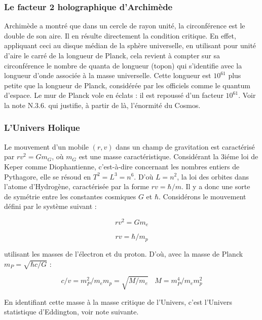 \documentclass[a4paper,12pt]{article}
\begin{document}
\subsubsection{Le facteur 2 holographique d'Archimède}

Archimède a montré que dans un cercle de rayon unité, la circonférence est le double de son aire. Il en résulte directement la condition critique. En effet, appliquant ceci au disque médian de la sphère universelle, en utilisant pour unité d’aire le carré de la longueur de Planck, cela revient à compter sur sa circonférence le nombre de quanta de longueur (topon) qui s’identifie avec la longueur d’onde associée à la masse universelle. Cette longueur est $10^{61}$ plus petite que la longueur de Planck, considérée par les officiels comme le quantum d’espace. Le mur de Planck vole en éclats : il est repoussé d’un facteur $10^{61}$. Voir la note N.3.6. qui justifie, à partir de là, l’énormité du Cosmos. 



\subsubsection{L'Univers Holique}

 Le mouvement d'un mobile $(r,v)$ dans un champ de gravitation est caractérisé par $rv^2 = Gm_G$, où $m_G$ est une masse caractéristique. Considérant la 3iéme loi de Keper comme Diophantienne, c’est-à-dire concernant les nombres entiers de Pythagore, elle se résoud en $T^2 = L^3 = n^6$. D'où $L = n^2$, la loi des orbites dans l'atome d'Hydrogène, caractérisée par la forme $rv = \hbar/m$. Il y a donc une sorte de symétrie entre les constantes cosmiques $G$ et $\hbar$. Considérons le mouvement défini par le système suivant :
 
\begin{equation}
r v^2 = Gm_e
\end{equation}

\begin{equation}
r v = \hbar/m_p
\end{equation}

utilisant les masses de l'électron et du proton. D'où, avec la masse de Planck $m_P = \sqrt{\hbar c/G}$ :

\begin{equation}
c/v = m_P^2/m_em_p = \sqrt{M/m_e}                 ~~~~           M = m_P^4/m_em_p^2
\end{equation}

En identifiant cette masse à la masse critique de l'Univers, c'est  l'Univers statistique d'Eddington, voir note suivante.
\end{document}

